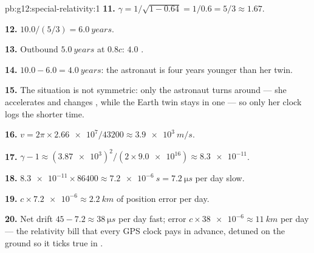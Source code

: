 \begin{solution}{pb:g12:special-relativity:1}
\textbf{11.} $\gamma = 1/\sqrt{1 - 0.64} = 1/0.6 = 5/3 \approx 1.67$.

\textbf{12.} $10.0/(5/3) = \qty{6.0}{years}$.

\textbf{13.} Outbound $\qty{5.0}{years}$ at $0.8c$: $4.0$ .

\textbf{14.} $10.0 - 6.0 = \qty{4.0}{years}$: the astronaut is four
years younger than her twin.

\textbf{15.} The situation is not symmetric: only the astronaut turns
around --- she accelerates and changes , while the Earth
twin stays in one --- so only her clock logs the shorter time.

\textbf{16.} $v = 2\pi \times \num{2.66e7}/\num{43200} \approx
\qty{3.9e3}{m/s}$.

\textbf{17.} $\gamma - 1 \approx (\num{3.87e3})^2/(2 \times
\num{9.0e16}) \approx \num{8.3e-11}$.

\textbf{18.} $\num{8.3e-11} \times \num{86400} \approx \qty{7.2e-6}{s}
= \qty{7.2}{\micro s}$ per day slow.

\textbf{19.} $c \times \num{7.2e-6} \approx \qty{2.2}{km}$ of position
error per day.

\textbf{20.} Net drift $45 - 7.2 \approx \qty{38}{\micro s}$ per day
fast; error $c \times \num{38e-6} \approx \qty{11}{km}$ per day ---
the relativity bill that every GPS clock pays in advance, detuned on
the ground so it ticks true in .
\end{solution}
